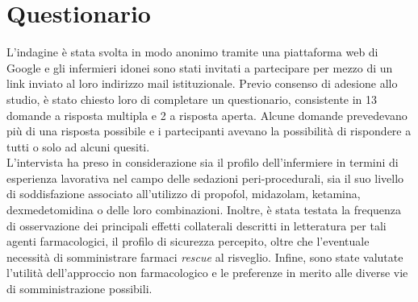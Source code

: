 \section{Questionario}

L'indagine è stata svolta in modo anonimo tramite una piattaforma web di Google e gli infermieri idonei sono stati invitati a partecipare per mezzo di un link inviato al loro indirizzo mail istituzionale. Previo consenso di adesione allo studio, è stato chiesto loro di completare un questionario, consistente in 13 domande a risposta multipla e 2 a risposta aperta. Alcune domande prevedevano più di una risposta possibile e i partecipanti avevano la possibilità di rispondere a tutti o solo ad alcuni quesiti. 
\\L'intervista ha preso in considerazione sia il profilo dell'infermiere in termini di esperienza lavorativa nel campo delle sedazioni peri-procedurali, sia il suo livello di soddisfazione associato all'utilizzo di propofol, midazolam, ketamina, dexmedetomidina o delle loro combinazioni. Inoltre, è stata testata la frequenza di osservazione dei principali effetti collaterali descritti in letteratura per tali agenti farmacologici, il profilo di sicurezza percepito, oltre che l'eventuale necessità di somministrare farmaci \emph{rescue} al risveglio. Infine, sono state valutate l'utilità dell'approccio non farmacologico e le preferenze in merito alle diverse vie di somministrazione possibili. 


